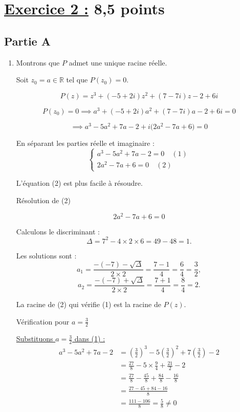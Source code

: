 \documentclass[12pt,a4paper]{article}
\begin{document}
\section*{\underline{Exercice 2 :} 8,5 points}

\subsection*{ Partie A}
\begin{enumerate}
\item Montrons que $P$ admet une unique racine réelle.

Soit $z_0 = a \in \mathbb{R}$ tel que $P(z_0) = 0$.

\[
P(z) = z^3 + (-5 + 2i)z^2 + (7 - 7i)z - 2 + 6i
\]

\[
P(z_0) = 0 \implies a^3 + (-5 + 2i)a^2 + (7 - 7i)a - 2 + 6i = 0
\]

\[
\implies a^3 - 5a^2 + 7a - 2 + i\big(2a^2 - 7a + 6\big) = 0
\]

En séparant les parties réelle et imaginaire :
\[
\begin{cases}
a^3 - 5a^2 + 7a - 2 = 0 \quad (1) \\
2a^2 - 7a + 6 = 0 \quad (2)
\end{cases}
\]

L'équation (2) est plus facile à résoudre.

Résolution de (2)

\[
2a^2 - 7a + 6 = 0
\]

Calculons le discriminant :
\[
\Delta = 7^2 - 4 \times 2 \times 6 = 49 - 48 = 1.
\]

Les solutions sont :
\[
a_1 = \frac{-(-7) - \sqrt{\Delta}}{2 \times 2} = \frac{7 - 1}{4} = \frac{6}{4} = \frac{3}{2},
\]
\[
a_2 = \frac{-(-7) + \sqrt{\Delta}}{2 \times 2} = \frac{7 + 1}{4} = \frac{8}{4} = 2.
\]

La racine de (2) qui vérifie (1) est la racine de $P(z)$.

Vérification pour $a = \frac{3}{2}$

\underline{Substituons $a = \frac{3}{2}$ dans (1) :}
\begin{align*}
a^3 - 5a^2 + 7a - 2 &= \left(\frac{3}{2}\right)^3 - 5\left(\frac{3}{2}\right)^2 + 7\left(\frac{3}{2}\right) - 2\\
										&=\frac{27}{8} - 5 \times \frac{9}{4} + \frac{21}{2} - 2\\
										&=\frac{27}{8} - \frac{45}{8} + \frac{84}{8} - \frac{16}{8}\\
										&=\frac{27 - 45 + 84 - 16}{8}\\
										&= \frac{111 - 106}{8} = \frac{5}{8} \neq 0
\end{align*}


\end{enumerate}
\end{document}
